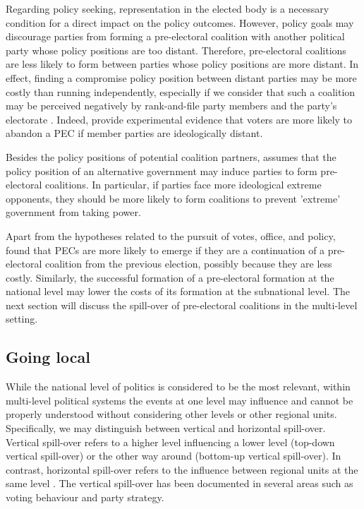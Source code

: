 \documentclass[]{interact}
\theoremstyle{plain}%
\theoremstyle{definition}
\theoremstyle{remark}
\begin{document}
Regarding policy seeking, representation in the elected body is a necessary condition for a direct impact on the policy outcomes. However, policy goals may discourage parties from forming a pre-electoral coalition with another political party whose policy positions are too distant. Therefore, pre-electoral coalitions are less likely to form between parties whose policy positions are more distant. In effect, finding a compromise policy position between distant parties may be more costly than running independently, especially if we consider that such a coalition may be perceived negatively by rank-and-file party members and the party's electorate \citep[198]{golder2006b}. Indeed, \citet{gschwend2008} provide experimental evidence that voters are more likely to abandon a PEC if member parties are ideologically distant.

Besides the policy positions of potential coalition partners, \citet{golder2006} assumes that the policy position of an alternative government may induce parties to form pre-electoral coalitions. In particular, if parties face more ideological extreme opponents, they should be more likely to form coalitions to prevent 'extreme' government from taking power.

Apart from the hypotheses related to the pursuit of votes, office, and policy, \citet{ibenskas2016} found that PECs are more likely to emerge if they are a continuation of a pre-electoral coalition from the previous election, possibly because they are less costly. 
Similarly, the successful formation of a pre-electoral formation at the national level may lower the costs of its formation at the subnational level. The next section will discuss the spill-over of pre-electoral coalitions in the multi-level setting.

\subsection{Going local}

While the national level of politics is considered to be the most relevant, within multi-level political systems the events at one level may influence and cannot be properly understood without considering other levels or other regional units. Specifically, we may distinguish between vertical and horizontal spill-over. Vertical spill-over refers to a higher level influencing a lower level (top-down vertical spill-over) or the other way around (bottom-up vertical spill-over). In contrast, horizontal spill-over refers to the influence between regional units at the same level \citep{schakel2021}. The vertical spill-over has been documented in several areas such as voting behaviour and party strategy. 
\end{document}
